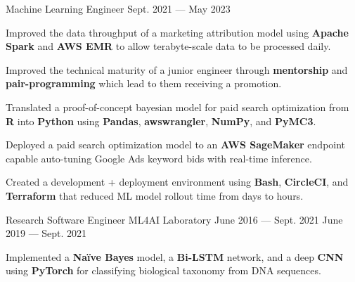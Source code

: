 \begin{cventries}
  \cventry
    {Machine Learning Engineer} %
    {} %
    {} %
    {Sept. 2021 --- May 2023} %
    {
      \vspace{-0.1cm}
      \begin{cvitems} %
        \item Improved the data throughput of a marketing attribution model using \textbf{Apache Spark} and \textbf{AWS EMR} to allow terabyte-scale data to be processed daily.
        \item Improved the technical maturity of a junior engineer through \textbf{mentorship} and \textbf{pair-programming} which lead to them receiving a promotion.
        \item Translated a proof-of-concept bayesian model for paid search optimization from \textbf{R} into \textbf{Python} using \textbf{Pandas}, \textbf{awswrangler}, \textbf{NumPy}, and \textbf{PyMC3}.
        \item Deployed a paid search optimization model to an \textbf{AWS SageMaker} endpoint capable auto-tuning Google Ads keyword bids with real-time inference.
        \item Created a development + deployment environment using \textbf{Bash}, \textbf{CircleCI}, and \textbf{Terraform} that reduced ML model rollout time from days to hours.
      \end{cvitems}
    }
  \vspace{.2cm}
  \cventry
    {Research Software Engineer} %
    {ML4AI Laboratory} %
    {June 2016 --- Sept. 2021} %
    {June 2019 --- Sept. 2021} %
    {
      \vspace{-0.1cm}
      \begin{cvitems} %
        \item Implemented a \textbf{Naïve Bayes} model, a \textbf{Bi-LSTM} network, and a deep \textbf{CNN} using \textbf{PyTorch} for classifying biological taxonomy from DNA sequences.

\end{cvitems}}
\end{cventries}

